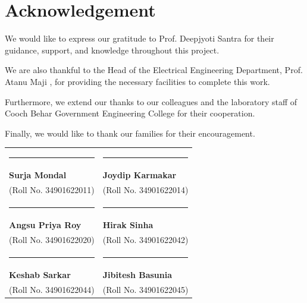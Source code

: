 \documentclass[12pt,a4paper]{report}
\begin{document}
\chapter*{Acknowledgement}
We would like to express our gratitude to Prof. Deepjyoti Santra for their guidance, support, and knowledge throughout this project.

We are also thankful to the Head of the Electrical Engineering Department, Prof. Atanu Maji , for providing the necessary facilities to complete this work.

Furthermore, we extend our thanks to our colleagues and the laboratory staff of Cooch Behar Government Engineering College for their cooperation.

Finally, we would like to thank our families for their encouragement.

\vspace{2cm}
\noindent
\begin{tabular}{@{}p{0.5\linewidth}p{0.5\linewidth}@{}}
\rule{6cm}{0.5pt} & \rule{6cm}{0.5pt} \\
\textbf{Surja Mondal} & \textbf{Joydip Karmakar} \\
(Roll No. 34901622011) & (Roll No. 34901622014) \\[2cm]

\rule{6cm}{0.5pt} & \rule{6cm}{0.5pt} \\
\textbf{Angsu Priya Roy} & \textbf{Hirak Sinha} \\
(Roll No. 34901622020) & (Roll No. 34901622042) \\[2cm]

\rule{6cm}{0.5pt} & \rule{6cm}{0.5pt} \\
\textbf{Keshab Sarkar} & \textbf{Jibitesh Basunia} \\
(Roll No. 34901622044) & (Roll No. 34901622045) \\
\end{tabular}

\renewcommand{\contentsname}{\textit{Contents}}
\tableofcontents
\listoffigures
\listoftables
\end{document}
